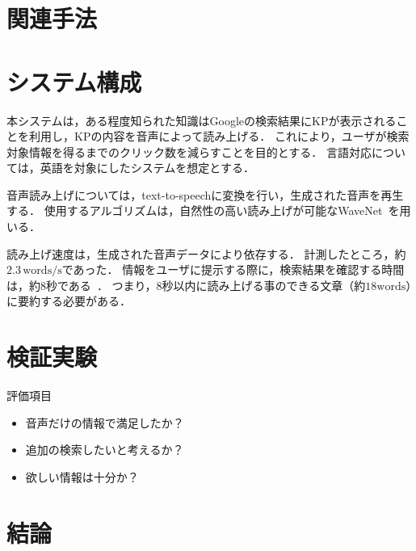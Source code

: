 \documentclass[uplatex,a4paper]{jsarticle}
\begin{document}
\section{関連手法}
\section{システム構成}

本システムは，ある程度知られた知識はGoogleの検索結果にKPが表示されることを利用し，KPの内容を音声によって読み上げる．
これにより，ユーザが検索対象情報を得るまでのクリック数を減らすことを目的とする．
言語対応については，英語を対象にしたシステムを想定とする．

音声読み上げについては，text-to-speechに変換を行い，生成された音声を再生する．
使用するアルゴリズムは，自然性の高い読み上げが可能なWaveNet~\cite{Oord2016}を用いる．

読み上げ速度は，生成された音声データにより依存する．
計測したところ，約$2.3\,\mathrm{words/s}$であった．
情報をユーザに提示する際に，検索結果を確認する時間は，約8秒である~\cite{Granka2004}．
つまり，8秒以内に読み上げる事のできる文章（約$18\mathrm{words}$）に要約する必要がある．


\section{検証実験}

評価項目
\begin{itemize}
    \item 音声だけの情報で満足したか？
    \item 追加の検索したいと考えるか？
    \item 欲しい情報は十分か？
\end{itemize}



\section{結論}




\end{document}
